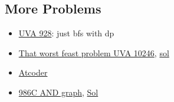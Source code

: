 \documentclass[8pt, a4paper, oneside, twocolumn]{extarticle}
\begin{document}
\subsection{More Problems}
\begin{itemize}
    \item \href{}{UVA 928}: just bfs with dp
    \item \href{https://uva.onlinejudge.org/external/102/10246.pdf}{That worst feast problem UVA 10246}, \href{https://gist.github.com/sourabhxyz/e55a0e3f7453e4514f1251b1ae6f0827}{sol}
    \item \href{https://gist.github.com/sourabhxyz/a9f9b7584631b8859692df0f4af0843d}{Atcoder}
    \item \href{https://codeforces.com/problemset/problem/986/C}{986C AND graph}, \href{https://codeforces.com/blog/entry/59758}{Sol}
\end{itemize}
\end{document}
